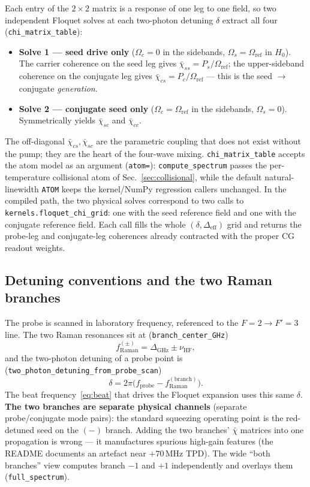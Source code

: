 \documentclass[11pt]{article}
\newcommand{\eff}{\mathrm{eff}}
\newcommand{\HF}{\mathrm{HF}}
\newcommand{\code}[1]{\texttt{#1}}
\newcommand{\rhobar}{\bar{\chi}}
\begin{document}
Each entry of the $2\times2$ matrix is a response of one leg to one field, so two
independent Floquet solves at each two-photon detuning $\delta$ extract all four
(\code{chi\_matrix\_table}):
\begin{itemize}[leftmargin=1.6em]
  \item \textbf{Solve 1 --- seed drive only} ($\Omega_c=0$ in the sidebands,
  $\Omega_s=\Omega_{\text{ref}}$ in $H_0$). The carrier coherence on the seed leg
  gives $\rhobar_{ss}=P_s/\Omega_{\text{ref}}$; the upper-sideband coherence on the
  conjugate leg gives $\rhobar_{cs}=P_c/\Omega_{\text{ref}}$ --- this is the seed
  $\to$ conjugate \emph{generation}.
  \item \textbf{Solve 2 --- conjugate seed only} ($\Omega_c=\Omega_{\text{ref}}$ in
  the sidebands, $\Omega_s=0$). Symmetrically yields $\rhobar_{sc}$ and
  $\rhobar_{cc}$.
\end{itemize}
The off-diagonal $\rhobar_{cs},\rhobar_{sc}$ are the parametric coupling that does
not exist without the pump; they are the heart of the four-wave mixing.
\code{chi\_matrix\_table} accepts the atom model as an argument
(\code{atom=}): \code{compute\_spectrum} passes the per-temperature collisional
atom of Sec.~\ref{sec:collisional}, while the default natural-linewidth
\code{ATOM} keeps the kernel/NumPy regression callers unchanged. In the
compiled path, the two physical solves correspond to two calls to
\code{kernels.floquet\_chi\_grid}: one with the seed reference field and one with
the conjugate reference field. Each call fills the whole
$(\delta,\Delta_\eff)$ grid and returns the probe-leg and conjugate-leg
coherences already contracted with the proper CG readout weights.

\subsection{Detuning conventions and the two Raman branches}
\label{sec:branch}

The probe is scanned in laboratory frequency, referenced to the
$F=2\!\to\!F'=3$ line. The two Raman resonances sit at
(\code{branch\_center\_GHz})
\begin{equation}
f^{(\pm)}_{\text{Raman}}=\Delta_{\text{GHz}}\pm\nu_{\HF},
\end{equation}
and the two-photon detuning of a probe point is
(\code{two\_photon\_detuning\_from\_probe\_scan})
\begin{equation}
\delta=2\pi\big(f_{\text{probe}}-f^{(\text{branch})}_{\text{Raman}}\big).
\end{equation}
The beat frequency~\eqref{eq:beat} that drives the Floquet expansion uses this same
$\delta$. \textbf{The two branches are separate physical channels} (separate
probe/conjugate mode pairs): the standard squeezing operating point is the
red-detuned seed on the $(-)$ branch. Adding the two branches' $\rhobar$ matrices
into one propagation is wrong --- it manufactures spurious high-gain features (the
README documents an artefact near $+70\,$MHz TPD). The wide ``both branches'' view
computes branch $-1$ and $+1$ independently and overlays them
(\code{full\_spectrum}).
\end{document}
